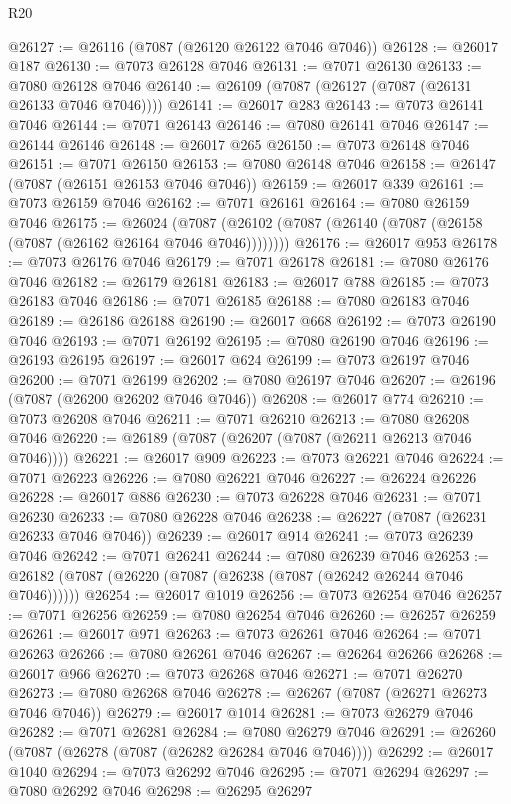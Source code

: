 \begin{lexlean}{R20}
\begin{coremodule}
{@26127 := @26116 (@7087 (@26120 @26122 @7046 @7046))
@26128 := @26017 @187
@26130 := @7073 @26128 @7046
@26131 := @7071 @26130
@26133 := @7080 @26128 @7046
@26140 := @26109 (@7087 (@26127 (@7087 (@26131 @26133 @7046 @7046))))
@26141 := @26017 @283
@26143 := @7073 @26141 @7046
@26144 := @7071 @26143
@26146 := @7080 @26141 @7046
@26147 := @26144 @26146
@26148 := @26017 @265
@26150 := @7073 @26148 @7046
@26151 := @7071 @26150
@26153 := @7080 @26148 @7046
@26158 := @26147 (@7087 (@26151 @26153 @7046 @7046))
@26159 := @26017 @339
@26161 := @7073 @26159 @7046
@26162 := @7071 @26161
@26164 := @7080 @26159 @7046
@26175 := @26024
    (@7087 (@26102 (@7087 (@26140 (@7087 (@26158 (@7087 (@26162 @26164 @7046 @7046))))))))
@26176 := @26017 @953
@26178 := @7073 @26176 @7046
@26179 := @7071 @26178
@26181 := @7080 @26176 @7046
@26182 := @26179 @26181
@26183 := @26017 @788
@26185 := @7073 @26183 @7046
@26186 := @7071 @26185
@26188 := @7080 @26183 @7046
@26189 := @26186 @26188
@26190 := @26017 @668
@26192 := @7073 @26190 @7046
@26193 := @7071 @26192
@26195 := @7080 @26190 @7046
@26196 := @26193 @26195
@26197 := @26017 @624
@26199 := @7073 @26197 @7046
@26200 := @7071 @26199
@26202 := @7080 @26197 @7046
@26207 := @26196 (@7087 (@26200 @26202 @7046 @7046))
@26208 := @26017 @774
@26210 := @7073 @26208 @7046
@26211 := @7071 @26210
@26213 := @7080 @26208 @7046
@26220 := @26189 (@7087 (@26207 (@7087 (@26211 @26213 @7046 @7046))))
@26221 := @26017 @909
@26223 := @7073 @26221 @7046
@26224 := @7071 @26223
@26226 := @7080 @26221 @7046
@26227 := @26224 @26226
@26228 := @26017 @886
@26230 := @7073 @26228 @7046
@26231 := @7071 @26230
@26233 := @7080 @26228 @7046
@26238 := @26227 (@7087 (@26231 @26233 @7046 @7046))
@26239 := @26017 @914
@26241 := @7073 @26239 @7046
@26242 := @7071 @26241
@26244 := @7080 @26239 @7046
@26253 := @26182 (@7087 (@26220 (@7087 (@26238 (@7087 (@26242 @26244 @7046 @7046))))))
@26254 := @26017 @1019
@26256 := @7073 @26254 @7046
@26257 := @7071 @26256
@26259 := @7080 @26254 @7046
@26260 := @26257 @26259
@26261 := @26017 @971
@26263 := @7073 @26261 @7046
@26264 := @7071 @26263
@26266 := @7080 @26261 @7046
@26267 := @26264 @26266
@26268 := @26017 @966
@26270 := @7073 @26268 @7046
@26271 := @7071 @26270
@26273 := @7080 @26268 @7046
@26278 := @26267 (@7087 (@26271 @26273 @7046 @7046))
@26279 := @26017 @1014
@26281 := @7073 @26279 @7046
@26282 := @7071 @26281
@26284 := @7080 @26279 @7046
@26291 := @26260 (@7087 (@26278 (@7087 (@26282 @26284 @7046 @7046))))
@26292 := @26017 @1040
@26294 := @7073 @26292 @7046
@26295 := @7071 @26294
@26297 := @7080 @26292 @7046
@26298 := @26295 @26297
}
\end{coremodule}
\end{lexlean}
